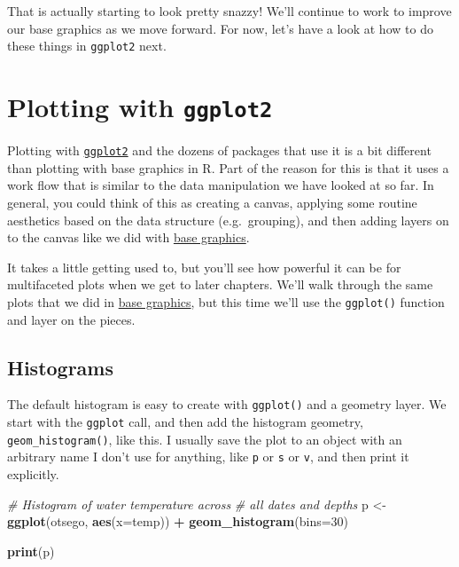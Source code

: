 \documentclass[
]{book}
\newenvironment{Shaded}{\begin{snugshade}}{\end{snugshade}}
\newcommand{\CommentTok}[1]{\textcolor[rgb]{0.56,0.35,0.01}{\textit{#1}}}
\newcommand{\DataTypeTok}[1]{\textcolor[rgb]{0.13,0.29,0.53}{#1}}
\newcommand{\DecValTok}[1]{\textcolor[rgb]{0.00,0.00,0.81}{#1}}
\newcommand{\KeywordTok}[1]{\textcolor[rgb]{0.13,0.29,0.53}{\textbf{#1}}}
\newcommand{\NormalTok}[1]{#1}
\newcommand{\OperatorTok}[1]{\textcolor[rgb]{0.81,0.36,0.00}{\textbf{#1}}}
\newcommand{\StringTok}[1]{\textcolor[rgb]{0.31,0.60,0.02}{#1}}
\begin{document}
That is actually starting to look pretty snazzy! We'll continue to work to improve our base graphics as we move forward. For now, let's have a look at how to do these things in \texttt{ggplot2} next.

\hypertarget{plotting-with-ggplot2}{%
\section{\texorpdfstring{Plotting with \texttt{ggplot2}}{Plotting with ggplot2}}\label{plotting-with-ggplot2}}

Plotting with \href{https://ggplot2.tidyverse.org/}{\texttt{ggplot2}} and the dozens of packages that use it is a bit different than plotting with base graphics in R. Part of the reason for this is that it uses a work flow that is similar to the data manipulation we have looked at so far. In general, you could think of this as creating a canvas, applying some routine aesthetics based on the data structure (e.g.~grouping), and then adding layers on to the canvas like we did with \protect\hyperlink{base-graphics}{base graphics}.

It takes a little getting used to, but you'll see how powerful it can be for multifaceted plots when we get to later chapters. We'll walk through the same plots that we did in \protect\hyperlink{base-graphics}{base graphics}, but this time we'll use the \texttt{ggplot()} function and layer on the pieces.

\hypertarget{gghists}{%
\subsection{Histograms}\label{gghists}}

The default histogram is easy to create with \texttt{ggplot()} and a geometry layer. We start with the \texttt{ggplot} call, and then add the histogram geometry, \texttt{geom\_histogram()}, like this. I usually save the plot to an object with an arbitrary name I don't use for anything, like \texttt{p} or \texttt{s} or \texttt{v}, and then print it explicitly.

\begin{Shaded}
\begin{Highlighting}[]
\CommentTok{# Histogram of water temperature across }
\CommentTok{# all dates and depths}
\NormalTok{p <-}\StringTok{ }\KeywordTok{ggplot}\NormalTok{(otsego, }\KeywordTok{aes}\NormalTok{(}\DataTypeTok{x=}\NormalTok{temp)) }\OperatorTok{+}\StringTok{ }\KeywordTok{geom_histogram}\NormalTok{(}\DataTypeTok{bins=}\DecValTok{30}\NormalTok{)}

\KeywordTok{print}\NormalTok{(p)}
\end{Highlighting}
\end{Shaded}
\end{document}
